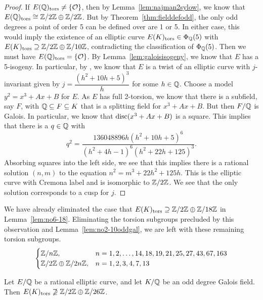\begin{proof}
If $E(\mathbb{Q})_{\text{tors}} \neq \{ \mathcal{O} \}$, then by Lemma~\ref{lem:najman2sylow}, we know that $E(\mathbb{Q})_{\text{tors}} \cong \mathbb{Z}/2\mathbb{Z} \oplus \mathbb{Z}/2\mathbb{Z}$. But by Theorem~\ref{thm:fielddefodd}, the only odd degrees a point of order 5 can be defined over are 1 or 5. In either case, this would imply the existence of an elliptic curve $E(K)_{\text{tors}} \in \Phi_{\mathbb{Q}}(5)$ with $E(K)_{\text{tors}} \supseteq \mathbb{Z}/2\mathbb{Z} \oplus \mathbb{Z}/10\mathbb{Z}$, contradicting the classification of $\Phi_{\mathbb{Q}}(5)$. Then we must have $E(\mathbb{Q})_{\text{tors}} = \{ \mathcal{O} \}$. By Lemma~\ref{lem:galoisisogeny}, we know that $E$ has a 5-isogeny. In particular, by \cite[Table~3]{lozanorobledo13}, we know that $E$ is a twist of an elliptic curve with $j$-invariant given by $j= \dfrac{(h^2 + 10h + 5)^3}{h}$ for some $h \in \mathbb{Q}$. Choose a model $y^2= x^3 + Ax + B$ for $E$. As $E$ has full 2-torsion, we know that there is a subfield, say $F$, with $\mathbb{Q} \subseteq F \subseteq K$ that is a splitting field for $x^3 + Ax + B$. But then $F/\mathbb{Q}$ is Galois. In particular, we know that $\operatorname{disc}(x^3 + Ax + B)$ is a square. This implies that there is a $q \in \mathbb{Q}$ with
	\[
	q^2= \dfrac{136048896 h (h^2 + 10h + 5)^6}{(h^2 + 4h - 1)^6 (h^2 + 22h + 125)^3}.
	\]
Absorbing squares into the left side, we see that this implies there is a rational solution $(n,m)$ to the equation $n^2= m^3 + 22h^2 + 125h$. This is the elliptic curve with Cremona label \tntyat{} and is isomorphic to $\mathbb{Z}/2\mathbb{Z}$. We see that the only solution corresponds to a cusp for $j$. 
\end{proof}


We have already eliminated the case that $E(K)_{\text{tors}} \supseteq \mathbb{Z}/2\mathbb{Z} \oplus \mathbb{Z}/18\mathbb{Z}$ in Lemma~\ref{lem:no6-18}. Eliminating the torsion subgroups precluded by this observation and Lemma~\ref{lem:no2-10oddgal}, we are left with these remaining torsion subgroups. 
	\[
	\begin{cases}
	\mathbb{Z}/n\mathbb{Z}, & n= 1, 2, \ldots, 14, 18, 19, 21, 25, 27, 43, 67, 163 \\
	\mathbb{Z}/2\mathbb{Z} \oplus \mathbb{Z}/2n\mathbb{Z}, & n= 1, 2, 3, 4, 7, 13
	\end{cases}
	\]


\begin{lem} \label{lem:no2-26odd}
Let $E/\mathbb{Q}$ be a rational elliptic curve, and let $K/\mathbb{Q}$ be an odd degree Galois field. Then $E(K)_{\text{tors}} \not\supseteq \mathbb{Z}/2\mathbb{Z} \oplus \mathbb{Z}/26\mathbb{Z}$.
\end{lem}

